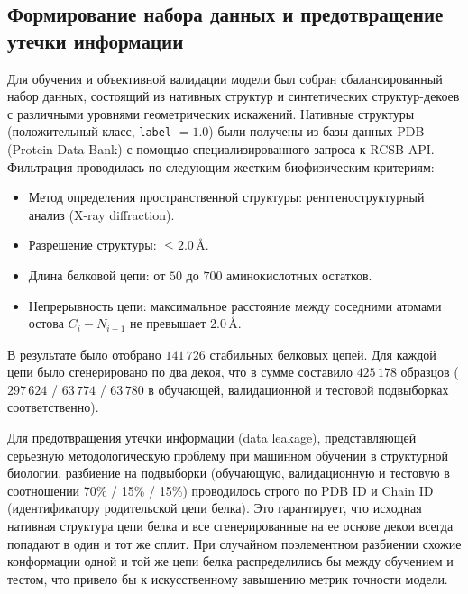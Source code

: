 \documentclass[12pt, a4paper]{article}
\begin{document}
\subsection{Формирование набора данных и предотвращение утечки информации}
Для обучения и объективной валидации модели был собран сбалансированный набор данных, состоящий из нативных структур и синтетических структур-декоев с различными уровнями геометрических искажений.
Нативные структуры (положительный класс, \texttt{label} $= 1.0$) были получены из базы данных PDB (Protein Data Bank) с помощью специализированного запроса к RCSB API. Фильтрация проводилась по следующим жестким биофизическим критериям:
\begin{itemize}
    \item Метод определения пространственной структуры: рентгеноструктурный анализ (X-ray diffraction).
    \item Разрешение структуры: $\le 2.0\,\text{\AA}$.
    \item Длина белковой цепи: от $50$ до $700$ аминокислотных остатков.
    \item Непрерывность цепи: максимальное расстояние между соседними атомами остова $C_i - N_{i+1}$ не превышает $2.0\,\text{\AA}$.
\end{itemize}
В результате было отобрано $141\,726$ стабильных белковых цепей. Для каждой цепи было сгенерировано по два декоя, что в сумме составило $425\,178$ образцов ($297\,624$ / $63\,774$ / $63\,780$ в обучающей, валидационной и тестовой подвыборках соответственно).

Для предотвращения утечки информации (data leakage), представляющей серьезную методологическую проблему при машинном обучении в структурной биологии, разбиение на подвыборки (обучающую, валидационную и тестовую в соотношении 70\% / 15\% / 15\%) проводилось строго по PDB ID и Chain ID (идентификатору родительской цепи белка). Это гарантирует, что исходная нативная структура цепи белка и все сгенерированные на ее основе декои всегда попадают в один и тот же сплит. При случайном поэлементном разбиении схожие конформации одной и той же цепи белка распределились бы между обучением и тестом, что привело бы к искусственному завышению метрик точности модели.
\end{document}
